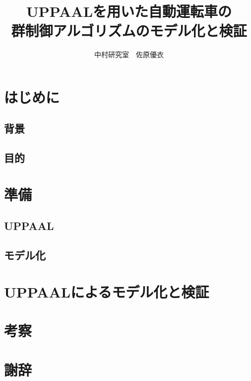 \documentclass{jsarticle}
\begin{document}
\title{UPPAALを用いた自動運転車の\\群制御アルゴリズムのモデル化と検証}
\author{中村研究室　佐原優衣}
\maketitle

\section{はじめに}
	\subsection{背景}
	\subsection{目的}
\section{準備}
	\subsection{UPPAAL}
	\subsection{モデル化}
\section{UPPAALによるモデル化と検証}
\section{考察}
\section*{謝辞}
\end{document}
